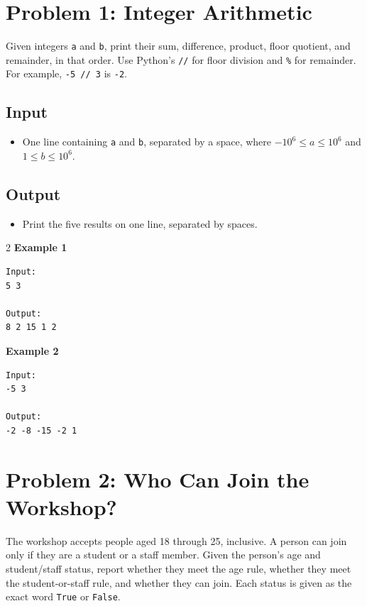 \documentclass[12pt,oneside,openany]{article}
\begin{document}
\newpage
\section*{Problem 1: Integer Arithmetic}

Given integers \texttt{a} and \texttt{b}, print their sum, difference, product, floor quotient, and remainder, in that order. Use Python's \texttt{//} for floor division and \texttt{\%} for remainder. For example, \texttt{-5 // 3} is \texttt{-2}.

\subsection*{Input}
\begin{itemize}
    \item One line containing \texttt{a} and \texttt{b}, separated by a space, where $-10^6 \leq a \leq 10^6$ and $1 \leq b \leq 10^6$.
\end{itemize}

\subsection*{Output}
\begin{itemize}
    \item Print the five results on one line, separated by spaces.
\end{itemize}
\vspace{0.2cm}

\begin{example*}{}{}
\begin{multicols}{2}
\textbf{Example 1}
\begin{verbatim}
Input:
5 3

Output:
8 2 15 1 2
\end{verbatim}
\textbf{Example 2}
\begin{verbatim}
Input:
-5 3

Output:
-2 -8 -15 -2 1
\end{verbatim}
\end{multicols}
\end{example*}
\newpage
\section*{Problem 2: Who Can Join the Workshop?}

The workshop accepts people aged 18 through 25, inclusive. A person can join only if they are a student or a staff member. Given the person's age and student/staff status, report whether they meet the age rule, whether they meet the student-or-staff rule, and whether they can join. Each status is given as the exact word \texttt{True} or \texttt{False}.
\end{document}
